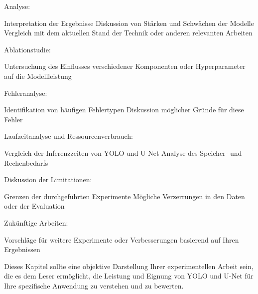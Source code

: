 Analyse:

Interpretation der Ergebnisse
Diskussion von Stärken und Schwächen der Modelle
Vergleich mit dem aktuellen Stand der Technik oder anderen relevanten Arbeiten


Ablationstudie:

Untersuchung des Einflusses verschiedener Komponenten oder Hyperparameter auf die Modellleistung


Fehleranalyse:

Identifikation von häufigen Fehlertypen
Diskussion möglicher Gründe für diese Fehler


Laufzeitanalyse und Ressourcenverbrauch:

Vergleich der Inferenzzeiten von YOLO und U-Net
Analyse des Speicher- und Rechenbedarfs


Diskussion der Limitationen:

Grenzen der durchgeführten Experimente
Mögliche Verzerrungen in den Daten oder der Evaluation


Zukünftige Arbeiten:

Vorschläge für weitere Experimente oder Verbesserungen basierend auf Ihren Ergebnissen



Dieses Kapitel sollte eine objektive Darstellung Ihrer experimentellen Arbeit sein, die es dem Leser ermöglicht, die Leistung und Eignung von YOLO und U-Net für Ihre spezifische Anwendung zu verstehen und zu bewerten.